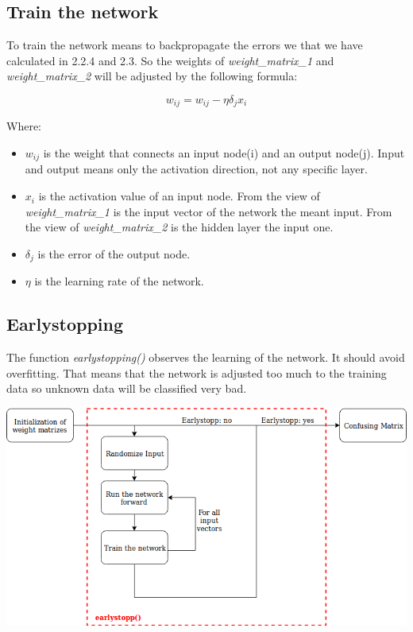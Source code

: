 \documentclass[10pt,a4paper]{article}
\begin{document}
	\subsection{Train the network}				%
	To train the network means to backpropagate the errors we that we have calculated in 2.2.4 and 2.3. So the weights of \textit{weight\_matrix\_1} and \textit{weight\_matrix\_2} will be adjusted by the following formula:
	\begin{center}
		\begin{equation}
		w_{ij} = w_{ij} - \eta \delta_j x_i
		\end{equation} 
	\end{center}
	Where:
	\begin{itemize}
		\item $w_{ij}$ is the weight that connects an input node(i) and an output node(j). Input and output means only the activation direction, not any specific layer.
		\item $x_i$ is the activation value of an input node. From the view of \textit{weight\_matrix\_1} is the input vector of the network the meant input. From the view of \textit{weight\_matrix\_2} is the hidden layer the input one.
		\item  $\delta_j$ is the error of the output node.
		\item $\eta$ is the learning rate of the network. 

	\end{itemize}   
	\subsection{Earlystopping}				%
	The function \textit{earlystopping()} observes the learning of the network. It should avoid overfitting. That means that the network is adjusted too much to the training data so unknown data will be classified very bad.
	\begin{center}
		\includegraphics[width=0.9\linewidth]{"pictures/Untitled Diagram"}
	\end{center}
	  
\end{document}
